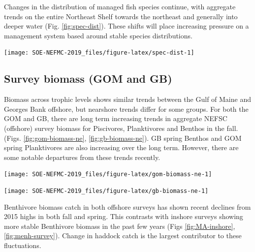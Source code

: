 \documentclass[10pt,]{article}
\let\origfigure\figure
\let\endorigfigure\endfigure
\renewenvironment{figure}[1][2] {
    \expandafter\origfigure\expandafter[H]
} {
    \endorigfigure
}
\begin{document}
Changes in the distribution of managed fish species continue, with
aggregate trends on the entire Northeast Shelf towards the northeast and
generally into deeper water (Fig. \ref{fig:spec-dist}). These shifts
will place increasing pressure on a management system based around
stable species distributions.

\begin{figure}

{\centering \texttt{[image: SOE-NEFMC-2019\_files/figure-latex/spec-dist-1]} 

}

\caption{Aggregate species distribution metrics for species in the Northeast Large Marine Ecosystem.}\label{fig:spec-dist}
\end{figure}

\subsection{Survey biomass (GOM and
GB)}\label{survey-biomass-gom-and-gb}

Biomass across trophic levels shows similar trends between the Gulf of
Maine and Georges Bank offshore, but nearshore trends differ for some
groups. For both the GOM and GB, there are long term increasing trends
in aggregate NEFSC (offshore) survey biomass for Piscivores,
Planktivores and Benthos in the fall. (Figs. \ref{fig:gom-biomass-ne},
\ref{fig:gb-biomass-ne}). GB spring Benthos and GOM spring Planktivores
are also increasing over the long term. However, there are some notable
departures from these trends recently.

\begin{figure}

{\centering \texttt{[image: SOE-NEFMC-2019\_files/figure-latex/gom-biomass-ne-1]} 

}

\caption{Fall (left) and spring (right) NEFSC surveyed biomass in the Gulf of Maine.}\label{fig:gom-biomass-ne}
\end{figure}

\begin{figure}

{\centering \texttt{[image: SOE-NEFMC-2019\_files/figure-latex/gb-biomass-ne-1]} 

}

\caption{Fall (left) and spring (right) NEFSC surveyed biomass on Georges Bank.}\label{fig:gb-biomass-ne}
\end{figure}

Benthivore biomass catch in both offshore surveys has shown recent
declines from 2015 highs in both fall and spring. This contrasts with
inshore surveys showing more stable Benthivore biomass in the past few
years (Figs \ref{fig:MA-inshore}, \ref{fig:menh-survey}). Change in
haddock catch is the largest contributor to these fluctuations.
\end{document}
